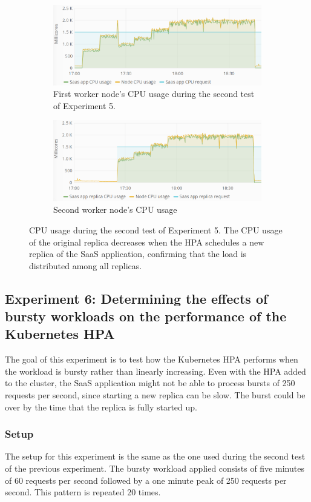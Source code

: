 \begin{figure}
\centering
\begin{subfigure}[b]{\columnwidth}
\centering
\includegraphics[width=0.75\columnwidth]{Images/Experiments/CPU/Grafana/cpu-saas-hpa-li-1.PNG}
\caption{First worker node's CPU usage during the second test of Experiment 5.}
\label{fig:cpu-saas-hpa-li-1}
\end{subfigure}
\hfill
\begin{subfigure}[b]{\columnwidth}
\centering
\includegraphics[width=0.75\columnwidth]{Images/Experiments/CPU/Grafana/cpu-saas-hpa-li-2.PNG}
\caption{Second worker node's CPU usage}
\label{fig:cpu-saas-hpa-li-2}
\end{subfigure}
\hfill
\caption{CPU usage during the second test of Experiment 5. The CPU usage of the original replica decreases when the HPA schedules a new replica of the SaaS application, confirming that the load is distributed among all replicas.}
\label{fig:cpu-cas-hpa-li-2}
\end{figure}

\subsection{Experiment 6: Determining the effects of bursty workloads on the performance of the Kubernetes HPA}
The goal of this experiment is to test how the Kubernetes HPA performs when the workload is bursty rather than linearly increasing. Even with the HPA added to the cluster, the SaaS application might not be able to process bursts of 250 requests per second, since starting a new replica can be slow. The burst could be over by the time that the replica is fully started up.

\subsubsection{Setup}
The setup for this experiment is the same as the one used during the second test of the previous experiment. The bursty workload applied consists of five minutes of 60 requests per second followed by a one minute peak of 250 requests per second. This pattern is repeated 20 times.  

